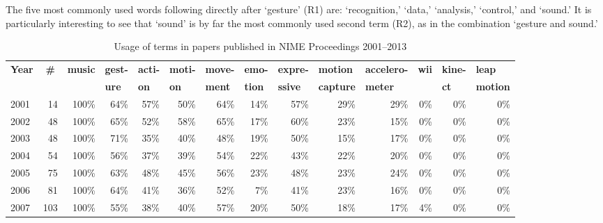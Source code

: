 The five most commonly used words following directly after `gesture' (R1) are: `recognition,' `data,' `analysis,' `control,' and `sound.' It is particularly interesting to see that `sound' is by far the most commonly used second term (R2), as in the combination `gesture and sound.' 


\begin{table*}[t]
\centering
{}
\caption{Usage of terms in papers published in NIME Proceedings 2001--2013}
\vspace{3pt} \noindent
\begin{small}
\begin{tabular}{lrrrrrrrrrrrrr}
\midrule
\textbf{Year} & \multicolumn{1}{c}{\textbf{\#}} & \multicolumn{1}{l}{\textbf{music}} & \multicolumn{1}{l}{\textbf{gest-}} & \multicolumn{1}{l}{\textbf{acti-}} & \multicolumn{1}{l}{\textbf{moti-}} & \multicolumn{1}{l}{\textbf{move-}} & \multicolumn{1}{l}{\textbf{emo-}} & \multicolumn{1}{l}{\textbf{expre-}} & \multicolumn{1}{l}{\textbf{motion}} & \multicolumn{1}{l}{\textbf{accelero-}} & \multicolumn{1}{l}{\textbf{wii}} & \multicolumn{1}{l}{\textbf{kine-}} & \multicolumn{1}{l}{\textbf{leap}} \\
\textbf{} & \multicolumn{1}{l}{\textbf{}} & \multicolumn{1}{l}{\textbf{}} & \multicolumn{1}{l}{\textbf{ure}} & \multicolumn{1}{l}{\textbf{on}} & \multicolumn{1}{l}{\textbf{on}} & \multicolumn{1}{l}{\textbf{ment}} & \multicolumn{1}{l}{\textbf{tion}} & \multicolumn{1}{l}{\textbf{ssive}} & \multicolumn{1}{l}{\textbf{capture}} & \multicolumn{1}{l}{\textbf{meter}} & \multicolumn{1}{l}{\textbf{}} & \multicolumn{1}{l}{\textbf{ct}} & \multicolumn{1}{l}{\textbf{motion}} \\
\toprule  
2001 & 14 & 100\% & 64\% & 57\% & 50\% & 64\% & 14\% & 57\% & 29\% & 29\% & 0\% & 0\% & 0\% \\ 
2002 & 48 & 100\% & 65\% & 52\% & 58\% & 65\% & 17\% & 60\% & 23\% & 15\% & 0\% & 0\% & 0\% \\ 
2003 & 48 & 100\% & 71\% & 35\% & 40\% & 48\% & 19\% & 50\% & 15\% & 17\% & 0\% & 0\% & 0\% \\ 
2004 & 54 & 100\% & 56\% & 37\% & 39\% & 54\% & 22\% & 43\% & 22\% & 20\% & 0\% & 0\% & 0\% \\ 
2005 & 75 & 100\% & 63\% & 48\% & 45\% & 56\% & 23\% & 48\% & 23\% & 24\% & 0\% & 0\% & 0\% \\ 
2006 & 81 & 100\% & 64\% & 41\% & 36\% & 52\% & 7\% & 41\% & 23\% & 16\% & 0\% & 0\% & 0\% \\ 
2007 & 103 & 100\% & 55\% & 38\% & 40\% & 57\% & 20\% & 50\% & 18\% & 17\% & 4\% & 0\% & 0\% \\ 

\end{tabular}
\end{small}
\end{table*}
